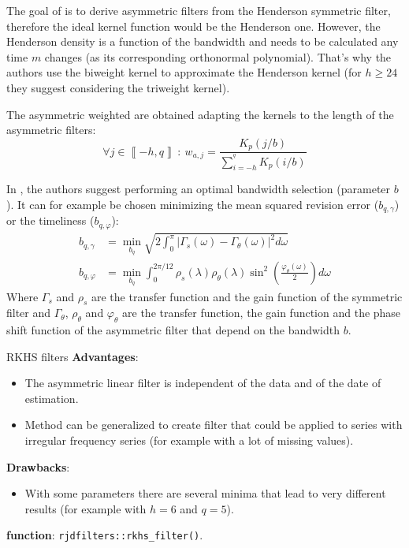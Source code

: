 \documentclass[fleqn,10pt]{latex/stylish_article} %
\providecommand{\tightlist}{%
  \setlength{\itemsep}{0pt}\setlength{\parskip}{0pt}}
\newcommand\1{\mathds{1}}
\begin{document}
The goal of \citet{dagumbianconcini2008} is to derive asymmetric filters from the Henderson symmetric filter, therefore the ideal kernel function would be the Henderson one.
However, the Henderson density is a function of the bandwidth and needs to be calculated any time \(m\) changes (as its corresponding orthonormal polynomial).
That's why the authors use the biweight kernel to approximate the Henderson kernel (for \(h\geq 24\) they suggest considering the triweight kernel).

The asymmetric weighted are obtained adapting the kernels to the length of the asymmetric filters:
\[
\forall j\in\left\llbracket -h,q\right\rrbracket\::\: w_{a,j}=\frac{K_p(j/b)}{\sum_{i=-h}^{^q}K_p(i/b)}
\]

In \citet{dagumbianconcini2015}, the authors suggest performing an optimal bandwidth selection (parameter \(b\)). It can for example be chosen minimizing the mean squared revision error (\(b_{q,\gamma}\)) or the timeliness (\(b_{q,\varphi}\)):
\begin{align*}
b_{q,\gamma}&=\underset{b_q}{\min}
\sqrt{2\int_{0}^{\pi}
\lvert \Gamma_s(\omega)-\Gamma_\theta(\omega)\rvert^2d \omega
} \\
b_{q,\varphi}&=\underset{b_q}{\min}
\int_{0}^{2\pi/12}
\rho_s(\lambda)\rho_\theta(\lambda)\sin^{2}\left(\frac{\varphi_\theta(\omega)}{2}\right)d \omega
\end{align*}
Where \(\Gamma_s\) and \(\rho_s\) are the transfer function and the gain function of the symmetric filter and \(\Gamma_\theta\), \(\rho_\theta\) and \(\varphi_\theta\) are the transfer function, the gain function and the phase shift function of the asymmetric filter that depend on the bandwidth \(b\).

\begin{summary}{RKHS filters}
\textbf{Advantages}:

\begin{itemize}
\item
  The asymmetric linear filter is independent of the data and of the date of estimation.
\item
  Method can be generalized to create filter that could be applied to series with irregular frequency series (for example with a lot of missing values).
\end{itemize}

\textbf{Drawbacks}:

\begin{itemize}
\tightlist
\item
  With some parameters there are several minima that lead to very different results (for example with \(h=6\) and \(q=5\)).
\end{itemize}

\textbf{\faRProject{} function}: \texttt{rjdfilters::rkhs\_filter()}.

\end{summary}
\end{document}
